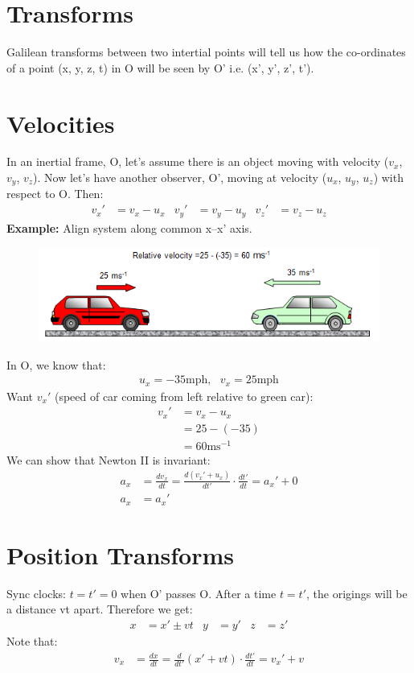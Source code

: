 \documentclass[a4paper, 11pt, normalem]{report}
\begin{document}
\section{Transforms}
Galilean transforms between two intertial points will tell us how the co-ordinates of a point (x, y, z, t) in O will be seen by O' i.e. (x', y', z', t').

\section{Velocities}
In an inertial frame, O, let's assume there is an object moving with velocity ($v_{x}$, $v_{y}$, $v_{z}$).
Now let's have another observer, O', moving at velocity ($u_{x}$, $u_{y}$, $u_{z}$) with respect to O.
Then:
\begin{align}
    v_{x}' &= v_{x} - u_{x} & v_{y}' &= v_{y} - u_{y} & v_{z}' &= v_{z} - u_{z}
\end{align}
\textbf{Example:} Align system along common x--x' axis.
\begin{figure}[H]
    \centering
    \includegraphics{Cars.png}
\end{figure}
In O, we know that:
\begin{align}
    u_{x} = -35\text{mph},~~~v_{x} = 25\text{mph}
\end{align}
Want $v_{x}'$ (speed of car coming from left relative to green car):
\begin{align}
    v_{x}' &= v_{x} - u_{x} \\
           &= 25 - (-35) \\
           &= 60\text{ms}^{-1}
\end{align}
We can show that Newton II is invariant:
\begin{align}
    a_{x} &= \frac{dv_{x}}{dt} = \frac{d(v_{x}' + u_{x})}{dt'}\cdot \frac{dt'}{dt} = a_{x}' + 0 \\
    a_{x} &= a_{x}'
\end{align}

\section{Position Transforms}
Sync clocks: $t = t' = 0$ when O' passes O.
After a time $t = t'$,  the origings will be a distance vt apart.
Therefore we get:
\begin{align}
    x &= x' \pm vt & y &= y' & z &= z'
\end{align}
Note that:
\begin{align}
    v_{x} &= \frac{dx}{dt} = \frac{d}{dt'}(x' + vt)\cdot\frac{dt'}{dt} = v_{x}' + v
\end{align}
\end{document}
